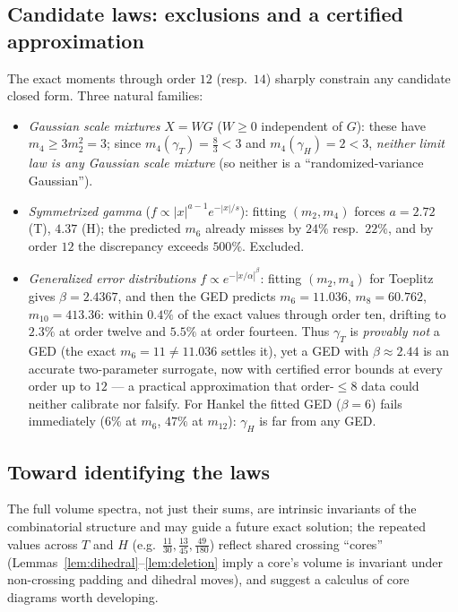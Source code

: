 ﻿\documentclass[11pt]{article}
\theoremstyle{remark}
\newcommand{\gT}{\gamma_T}
\newcommand{\gH}{\gamma_H}
\begin{document}
\subsection{Candidate laws: exclusions and a certified approximation}
\label{sec:candidates}
The exact moments through order $12$ (resp.\ $14$) sharply constrain any candidate
closed form. Three natural families:
\begin{itemize}
\item \emph{Gaussian scale mixtures} $X=WG$ ($W\ge0$ independent of $G$): these have
$m_4\ge3m_2^2=3$; since $m_4(\gT)=\tfrac83<3$ and $m_4(\gH)=2<3$, \emph{neither limit
law is any Gaussian scale mixture} (so neither is a ``randomized-variance Gaussian'').
\item \emph{Symmetrized gamma} ($f\propto|x|^{a-1}e^{-|x|/s}$): fitting $(m_2,m_4)$
forces $a=2.72$ (T), $4.37$ (H); the predicted $m_6$ already misses by $24\%$ resp.\
$22\%$, and by order $12$ the discrepancy exceeds $500\%$. Excluded.
\item \emph{Generalized error distributions} $f\propto e^{-|x/\alpha|^\beta}$:
fitting $(m_2,m_4)$ for Toeplitz gives $\beta=2.4367$, and then the
GED predicts $m_6=11.036$, $m_8=60.762$, $m_{10}=413.36$: within $0.4\%$ of the exact
values through order ten, drifting to $2.3\%$ at order twelve and $5.5\%$ at order
fourteen. Thus $\gT$ is
\emph{provably not} a GED (the exact $m_6=11\neq11.036$ settles it), yet a GED with
$\beta\approx2.44$ is an accurate two-parameter surrogate, now with
certified error bounds at every order up to $12$ --- a practical approximation that
order-$\le8$ data could neither calibrate nor falsify. For Hankel the fitted GED
($\beta=6$) fails immediately ($6\%$ at $m_6$, $47\%$ at $m_{12}$): $\gH$ is far from
any GED.
\end{itemize}

\subsection{Toward identifying the laws}
The full volume spectra, not just their sums, are intrinsic invariants of the
combinatorial structure and may guide a future exact solution; the repeated values
across $T$ and $H$ (e.g.\ $\tfrac{11}{30},\tfrac{13}{45},\tfrac{49}{180}$) reflect
shared crossing ``cores'' (Lemmas~\ref{lem:dihedral}--\ref{lem:deletion} imply a
core's volume is invariant under non-crossing padding and dihedral moves), and suggest
a calculus of core diagrams worth developing.
\end{document}
